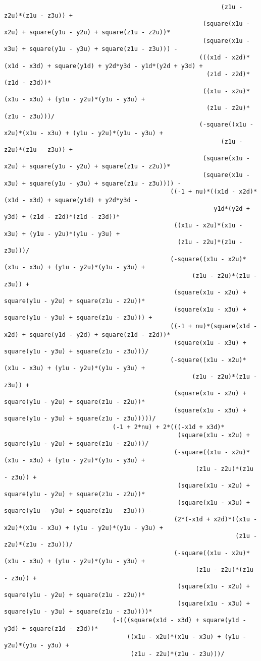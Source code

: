 \begin{lstlisting}
															(z1u - z2u)*(z1u - z3u)) + 
													   (square(x1u - x2u) + square(y1u - y2u) + square(z1u - z2u))*
													   (square(x1u - x3u) + square(y1u - y3u) + square(z1u - z3u))) - 
													  (((x1d - x2d)*(x1d - x3d) + square(y1d) + y2d*y3d - y1d*(y2d + y3d) + 
														(z1d - z2d)*(z1d - z3d))*
													   ((x1u - x2u)*(x1u - x3u) + (y1u - y2u)*(y1u - y3u) + 
														(z1u - z2u)*(z1u - z3u)))/
													  (-square((x1u - x2u)*(x1u - x3u) + (y1u - y2u)*(y1u - y3u) + 
															(z1u - z2u)*(z1u - z3u)) + 
													   (square(x1u - x2u) + square(y1u - y2u) + square(z1u - z2u))*
													   (square(x1u - x3u) + square(y1u - y3u) + square(z1u - z3u)))) - 
											  ((-1 + nu)*((x1d - x2d)*(x1d - x3d) + square(y1d) + y2d*y3d - 
														  y1d*(y2d + y3d) + (z1d - z2d)*(z1d - z3d))*
											   ((x1u - x2u)*(x1u - x3u) + (y1u - y2u)*(y1u - y3u) + 
												(z1u - z2u)*(z1u - z3u)))/
											  (-square((x1u - x2u)*(x1u - x3u) + (y1u - y2u)*(y1u - y3u) + 
													(z1u - z2u)*(z1u - z3u)) + 
											   (square(x1u - x2u) + square(y1u - y2u) + square(z1u - z2u))*
											   (square(x1u - x3u) + square(y1u - y3u) + square(z1u - z3u))) + 
											  ((-1 + nu)*(square(x1d - x2d) + square(y1d - y2d) + square(z1d - z2d))*
											   (square(x1u - x3u) + square(y1u - y3u) + square(z1u - z3u)))/
											  (-square((x1u - x2u)*(x1u - x3u) + (y1u - y2u)*(y1u - y3u) + 
													(z1u - z2u)*(z1u - z3u)) + 
											   (square(x1u - x2u) + square(y1u - y2u) + square(z1u - z2u))*
											   (square(x1u - x3u) + square(y1u - y3u) + square(z1u - z3u)))))/
							  (-1 + 2*nu) + 2*(((-x1d + x3d)*
												(square(x1u - x2u) + square(y1u - y2u) + square(z1u - z2u)))/
											   (-square((x1u - x2u)*(x1u - x3u) + (y1u - y2u)*(y1u - y3u) + 
													 (z1u - z2u)*(z1u - z3u)) + 
												(square(x1u - x2u) + square(y1u - y2u) + square(z1u - z2u))*
												(square(x1u - x3u) + square(y1u - y3u) + square(z1u - z3u))) - 
											   (2*(-x1d + x2d)*((x1u - x2u)*(x1u - x3u) + (y1u - y2u)*(y1u - y3u) + 
																(z1u - z2u)*(z1u - z3u)))/
											   (-square((x1u - x2u)*(x1u - x3u) + (y1u - y2u)*(y1u - y3u) + 
													 (z1u - z2u)*(z1u - z3u)) + 
												(square(x1u - x2u) + square(y1u - y2u) + square(z1u - z2u))*
												(square(x1u - x3u) + square(y1u - y3u) + square(z1u - z3u))))*
							  (-(((square(x1d - x3d) + square(y1d - y3d) + square(z1d - z3d))*
								  ((x1u - x2u)*(x1u - x3u) + (y1u - y2u)*(y1u - y3u) + 
								   (z1u - z2u)*(z1u - z3u)))/

\end{lstlisting}
